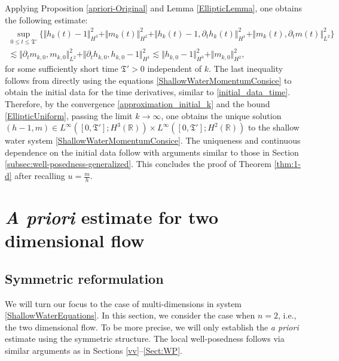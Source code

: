 \documentclass[reqno,11pt]{amsart}
\newcommand{\norm}[2]{\Vert #1 \Vert_{#2}}
\theoremstyle{plain}
\theoremstyle{definition}
\numberwithin{equation}{section}
\begin{document}
Applying Proposition \ref{apriori-Original} and Lemma \ref{EllipticLemma}, one obtains the following estimate:
\begin{equation}
\label{EllipticUniform}
\begin{gathered}
\sup_{0\leq t \leq \mathfrak{T}'} \bigl\lbrace 
\norm{h_k(t)-1}{H^3}^2+\norm{m_k(t)}{H^2}^2 + \norm{h_k(t)-1, \partial_t h_k(t)}{H^1}^2 + \norm{m_k(t), \partial_t m(t)}{L^2}^2 \bigr\rbrace \\
\lesssim \norm{\partial_t m_{k,0},m_{k,0}}{L^2}^2+\norm{\partial_t h_{k,0}, h_{k,0}- 1}{H^1}^2 \lesssim  \norm{h_{k,0}-1}{H^3}^2 + \norm{m_{k,0}}{H^2}^2,
\end{gathered}
\end{equation}
for some sufficiently short time $\mathfrak{T}'>0$ independent of $k$. The last inequality follows from directly using the equations \eqref{ShallowWaterMomentumConsice} to obtain the initial data for the time derivatives, similar to \eqref{initial_data_time}.
Therefore, by the convergence \eqref{approximation_initial_k} and the bound \eqref{EllipticUniform}, passing the limit $ k \rightarrow \infty $, 
one obtains %
the unique solution $(h-1,m)\in L^{\infty}([0,\mathfrak{T}'];H^3(\mathbb R))\times L^{\infty}([0,\mathfrak{T}'];H^2(\mathbb R))$ to the shallow water system \eqref{ShallowWaterMomentumConsice}. The uniqueness and continuous dependence on the initial data follow with arguments similar to those in Section \ref{subsec:well-posedness-generalized}. This concludes the proof of Theorem \ref{thm:1-d} after recalling $u=\frac{m}{h}$.

\section{{\it A priori} estimate for two dimensional flow}
\label{sec:2d} 

\subsection{Symmetric reformulation}
\label{subsec:2d-reformulation}

We will turn our focus to the case of multi-dimensions in system \eqref{ShallowWaterEquations}. In this section, we consider the case when $ n = 2 $, i.e., the two dimensional flow. To be more precise, we will only establish the {\it a priori} estimate using the symmetric structure. The local well-posedness follows via similar arguments as in Sections \ref{vv}--\ref{Sect:WP}.
\end{document}
